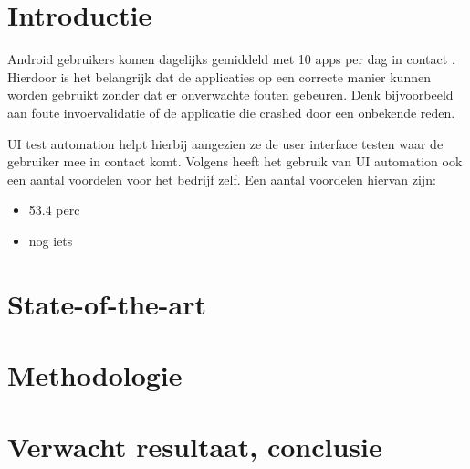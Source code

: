 \newcommand{\uiTestAut}{UI test automation}



\section{Introductie}%
\label{sec:introductie}

Android gebruikers komen dagelijks gemiddeld met 10 apps per dag in contact \autocite{PANKO2018} . 
Hierdoor is het belangrijk dat de applicaties op een correcte manier kunnen worden gebruikt zonder 
dat er onverwachte fouten gebeuren. Denk bijvoorbeeld aan foute invoervalidatie of
de applicatie die crashed door een onbekende reden.  %

UI test automation helpt hierbij aangezien ze de user interface testen waar de gebruiker mee in contact komt.
Volgens \textcite{Microfocus} heeft het gebruik van UI automation ook een aantal voordelen voor het bedrijf zelf.
Een aantal voordelen hiervan zijn: %
\begin{itemize}
\item 53.4 perc 
\item nog iets
\end{itemize}



\section{State-of-the-art}%
\label{sec:state-of-the-art}



\section{Methodologie}%
\label{sec:methodologie}


\section{Verwacht resultaat, conclusie}%
\label{sec:verwachte_resultaten}

